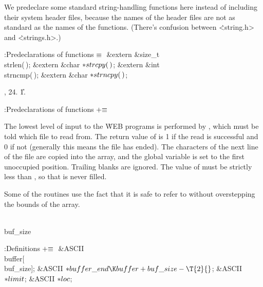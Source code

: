 We predeclare some standard string-handling functions here instead of
including their system header files, because the names of the header files
are not as standard as the names of the functions. (There's confusion
between \.{<string.h>} and \.{<strings.h>}.)

\Y\B\4:Predeclarations of functions\X${}\equiv{}$\6
\&{extern} \&{size\_t} \\{strlen}(\,);\6
\&{extern} \&{char} ${}{*}\\{strcpy}(\,){}$;\6
\&{extern} \&{int} \\{strncmp}(\,);\6
\&{extern} \&{char} ${}{*}\\{strncpy}(\,){}$;\par
{}, 24.
\U1.\fi

\B{}:Predeclarations of functions\X${}\mathrel+\equiv{}$\par
\fi

The lowest level of input to the \.{WEB} programs
is performed by , which must be told which file to read from.
The return value of  is 1 if the read is successful and 0 if
not (generally this means the file has ended).
The characters of the next line of the file
are copied into the  array,
and the global variable  is set to the first unoccupied position.
Trailing blanks are ignored. The value of  must be strictly less
than , so that  is
never filled.

Some of the routines use the fact that it is safe to refer to
 without overstepping the bounds of the array.

\Y\B\4\D\\{buf\_size}\5
\par
\Y\B\4:Definitions\X${}\mathrel+\equiv{}$\6
\&{ASCII} \\{buffer}[\\{buf\_size}];\6
\&{ASCII} ${}{*}\\{buffer\_end}\K\\{buffer}+\\{buf\_size}-\T{2}{}$;\6
\&{ASCII} ${}{*}\\{limit}{}$;\6
\&{ASCII} ${}{*}\\{loc}{}$;\par
\fi

